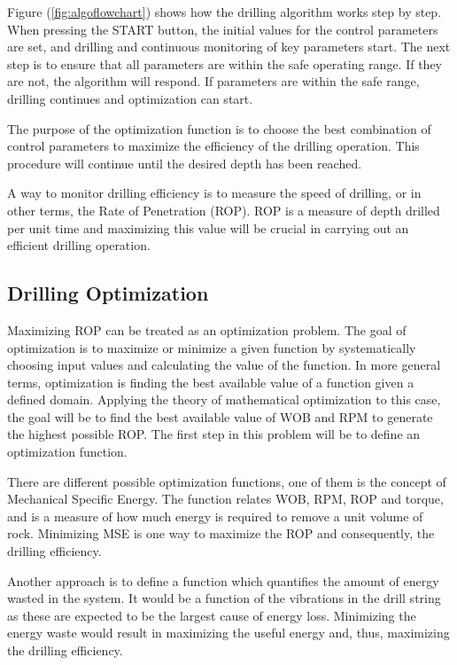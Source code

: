 Figure (\ref{fig:algoflowchart}) shows how the drilling algorithm works step by step. When pressing the START button, the initial values for the control parameters are set, and drilling and continuous monitoring of key parameters start. The next step is to ensure that all parameters are within the safe operating range. If they are not, the algorithm will respond. If parameters are within the safe range, drilling continues and optimization can start. 

The purpose of the optimization function is to choose the best combination of control parameters to maximize the efficiency of the drilling operation. This procedure will continue until the desired depth has been reached. 

A way to monitor drilling efficiency is to measure the speed of drilling, or in other terms, the Rate of Penetration (ROP). ROP is a measure of depth drilled per unit time and maximizing this value will be crucial in carrying out an efficient drilling operation. 

\subsection{Drilling Optimization}
Maximizing ROP can be treated as an optimization problem. The goal of optimization is to maximize or minimize a given function by systematically choosing input values and calculating the value of the function. In more general terms, optimization is finding the best available value of a function given a defined domain. Applying the theory of mathematical optimization to this case, the goal will be to find the best available value of WOB and RPM to generate the highest possible ROP. The first step in this problem will be to define an optimization function.

There are different possible optimization functions, one of them is the concept of Mechanical Specific Energy. The function relates WOB, RPM, ROP and torque, and is a measure of how much energy is required to remove a unit volume of rock. Minimizing MSE is one way to maximize the ROP and consequently, the drilling efficiency. 

Another approach is to define a function which quantifies the amount of energy wasted in the system. It would be a function of the vibrations in the drill string as these are expected to be the largest cause of energy loss. Minimizing the energy waste would result in maximizing the useful energy and, thus, maximizing the drilling efficiency.

